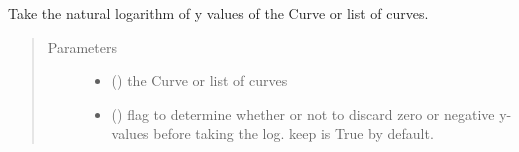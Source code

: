 \documentclass[letterpaper,10pt,english]{sphinxmanual}
\begin{document}
\begin{fulllineitems}
\label{\detokenize{pydv:pydvpy.log}}
Take the natural logarithm of y values of the Curve or list of curves.

\begin{sphinxVerbatim}[commandchars=\\\{\}]
  
\end{sphinxVerbatim}

\begin{sphinxVerbatim}[commandchars=\\\{\}]
 
\end{sphinxVerbatim}

\begin{sphinxVerbatim}[commandchars=\\\{\}]
\PYG{p}{[}\PYG{p}{]}
\end{sphinxVerbatim}
\begin{quote}\begin{description}
\item[{Parameters}] \leavevmode\begin{itemize}
\item {} 
 ({\hyperref[\detokenize{pydv:curve.Curve}]{}}) \textendash{} the Curve or list of curves

\item {} 
 (\sphinxstyleliteralemphasis{\sphinxupquote{, }}) \textendash{} flag to determine whether or not to discard zero or negative y-values before taking the log.
keep is True by default.

\end{itemize}

\end{description}\end{quote}

\end{fulllineitems}
\end{document}

